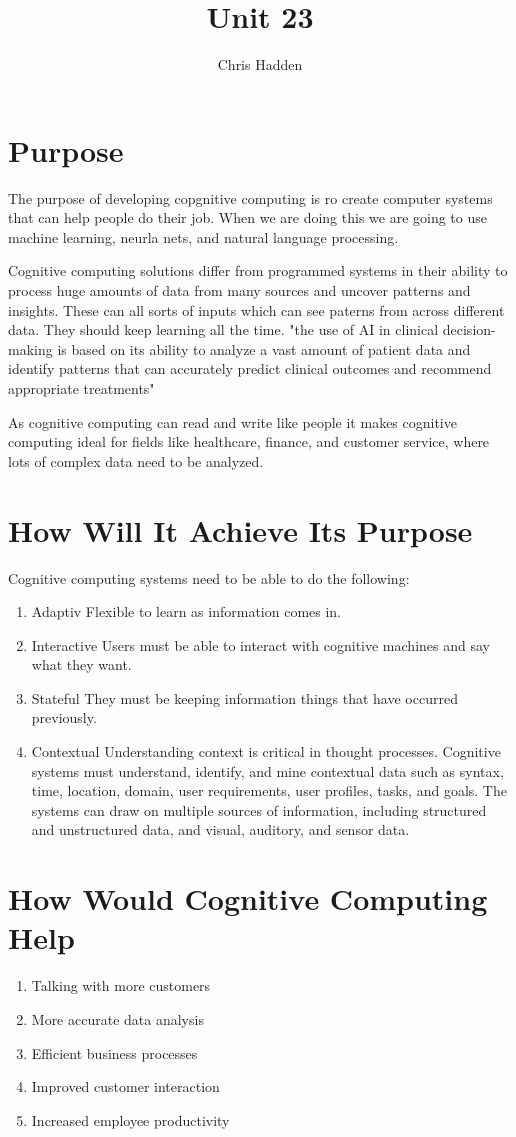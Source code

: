 \documentclass{article}
\title{Unit 23}
\author{Chris Hadden}
\date{}
\begin{document}
\maketitle

\section{Purpose}
The purpose of developing copgnitive computing is ro create computer systems that can help people do their job. When we are doing this we are going to use machine learning, neurla nets, and natural language processing.

Cognitive computing solutions differ from programmed systems in their ability to process huge amounts of data from many sources and uncover patterns and insights. These can all sorts of inputs which can see paterns from across different data. They should keep learning all the time. \cite{transform} "the use of AI in clinical decision-making is based on its ability to analyze a vast amount of patient data and identify patterns that can accurately predict clinical outcomes and recommend appropriate treatments"

As cognitive computing can read and write like people it makes cognitive computing ideal for fields like healthcare, finance, and customer service, where lots of complex data need to be analyzed.

\section{How Will It Achieve Its Purpose}
Cognitive computing systems need to be able to do the following:

\begin{enumerate}
	\item Adaptiv Flexible to learn as information comes in.
	\item Interactive Users must be able to interact with cognitive machines and say what they want.
	\item Stateful They must be keeping information things that have occurred previously.
	\item Contextual Understanding context is critical in thought processes. Cognitive systems must understand, identify, and mine contextual data such as syntax, time, location, domain, user requirements, user profiles, tasks, and goals. The systems can draw on multiple sources of information, including structured and unstructured data, and visual, auditory, and sensor data.\cite{context}
\end{enumerate}

\section{How Would Cognitive Computing Help}
\begin{enumerate}
	\item Talking with more customers
	\item More accurate data analysis
	\item Efficient business processes
	\item Improved customer interaction
	\item Increased employee productivity
\end{enumerate}

\break


\end{document}
